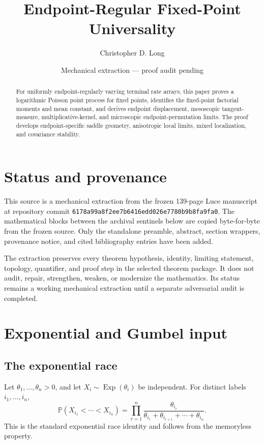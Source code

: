 \documentclass[11pt]{article}
\title{Endpoint-Regular Fixed-Point Universality}
\author{Christopher D. Long}
\date{Mechanical extraction --- proof audit pending}
\theoremstyle{remark}
\newcommand{\Pp}{\mathbb P}
\newcommand{\Exp}{\operatorname{Exp}}
\begin{document}
\maketitle
\begin{abstract}
For uniformly endpoint-regularly varying terminal rate arrays, this paper proves a logarithmic Poisson point process for fixed points, identifies the fixed-point factorial moments and mean constant, and derives endpoint displacement, mesoscopic tangent-measure, multiplicative-kernel, and microscopic endpoint-permutation limits. The proof develops endpoint-specific saddle geometry, anisotropic local limits, mixed localization, and covariance stability.
\end{abstract}
\tableofcontents
\section{Status and provenance}
This source is a mechanical extraction from the frozen 139-page Luce manuscript at repository commit \texttt{6178a99a8f2ee7b6416edd026e7780b9b8fa9fa0}. The mathematical blocks between the archival sentinels below are copied byte-for-byte from the frozen source. Only the standalone preamble, abstract, section wrappers, provenance notice, and cited bibliography entries have been added.

The extraction preserves every theorem hypothesis, identity, limiting statement, topology, quantifier, and proof step in the selected theorem package. It does not audit, repair, strengthen, weaken, or modernize the mathematics. Its status remains a working mechanical extraction until a separate adversarial audit is completed.

\section{Exponential and Gumbel input}

\subsection{The exponential race}
Let \(\theta_1,\ldots,\theta_n>0\), and let \(X_i\sim\Exp(\theta_i)\) be independent.  For distinct labels \(i_1,\ldots,i_n\),
\[
\Pp(X_{i_1}<\cdots<X_{i_n})
= \prod_{r=1}^n
 \frac{\theta_{i_r}}{\theta_{i_r}+\theta_{i_{r+1}}+\cdots+\theta_{i_n}}.
\]
This is the standard exponential race identity and follows from the memoryless property.
\end{document}
